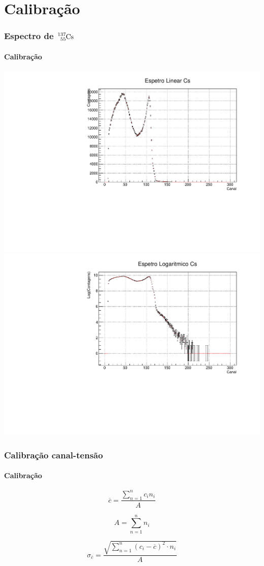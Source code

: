 \documentclass{beamer}
\begin{document}
\section{Calibração}
\begin{frame}\frametitle{Espectro de $\ce{^{137}_{55}Cs}$}\framesubtitle{Calibração}

   \centering
   \includegraphics[scale=0.25]{esplincs.pdf}
   \includegraphics[scale=0.25]{esplogcs.pdf}

\end{frame}


\begin{frame}\frametitle{Calibração canal-tensão}\framesubtitle{Calibração}

\begin{equation}
\overline{c}=\frac{\sum\limits_{n=1}^n c_{i}n_{i}}{A}
\label{centroide}
\end{equation}


\begin{equation}
A=\sum\limits_{n=1}^n n_{i}
\end{equation}


\begin{equation}
\sigma_{\overline{c}}=\frac{\sqrt{\sum\limits_{n=1}^n (c_{i}-\overline{c})^2 \cdot n_{i}    }}{A}
\label{e_centroide}
\end{equation}

\end{frame}
\end{document}

